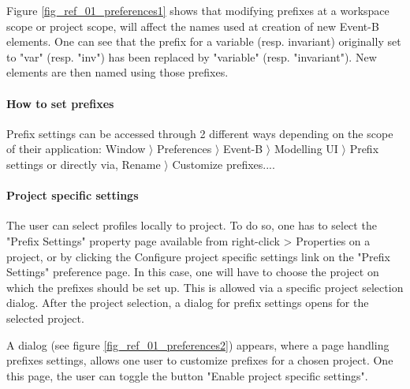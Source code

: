 
Figure \ref{fig_ref_01_preferences1} shows that modifying prefixes at a workspace scope or project scope, will affect the names used at creation of new Event-B elements. One can see that the prefix for a variable (resp. invariant) originally set to "var" (resp. "inv") has been replaced by "variable" (resp. "invariant"). New elements are then named using those prefixes.



\paragraph{How to set prefixes}

Prefix settings can be accessed through 2 different ways depending on the scope of their application: \textsf{Window $\rangle$ Preferences $\rangle$ Event-B $\rangle$ Modelling UI $\rangle$ Prefix settings} or directly via, \textsf{Rename $\rangle$ Customize prefixes...}.

\paragraph{Project specific settings}

The user can select profiles locally to project. To do so, one has to select the "Prefix Settings" property page available from right-click > Properties on a project, or by clicking the Configure project specific settings link on the "Prefix Settings" preference page. In this case, one will have to choose the project on which the prefixes should be set up. This is allowed via a specific project selection dialog. After the project selection, a dialog for prefix settings opens for the selected project. 

A dialog (see figure \ref{fig_ref_01_preferences2}) appears, where a page handling prefixes settings, allows one user to customize prefixes for a chosen project. One this page, the user can toggle the button "Enable project specific settings".

